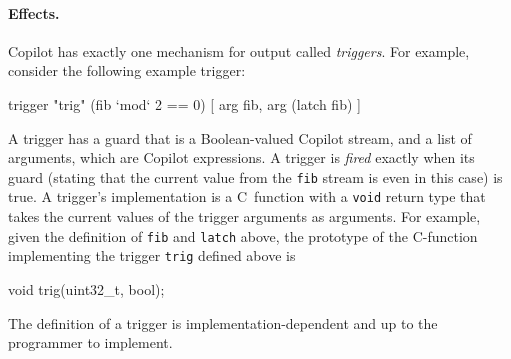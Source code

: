 \paragraph{Effects.}
Copilot has exactly one mechanism for output called \emph{triggers}.  For
example, consider the following example trigger:
%
\begin{code}
trigger "trig" (fib `mod` 2 == 0)
  [ arg fib, arg (latch fib) ]
\end{code}
A trigger has a guard that is a Boolean-valued Copilot stream, and a list of
arguments, which are Copilot expressions.  A trigger is \emph{fired} exactly
when its guard (stating that the current value from the {\tt fib} stream is
even in this case) is true.  A trigger's implementation is a C~function with a
{\tt void} return type that takes the current values of the trigger arguments as
arguments.  For example, given the definition of {\tt fib} and {\tt latch}
above, the prototype of the C-function implementing the trigger {\tt trig}
defined above is
%
\begin{code}
void trig(uint32_t, bool);
\end{code}
%
The definition of a trigger is implementation-dependent and up to
the programmer to implement.

